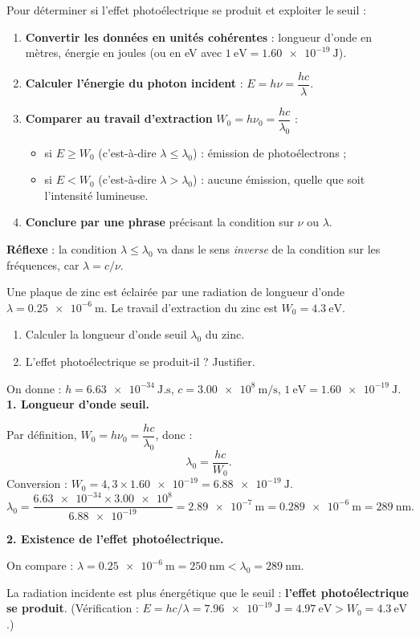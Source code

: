\documentclass[11pt]{article}
\begin{document}
\begin{methode}
Pour déterminer si l'effet photoélectrique se produit et exploiter le seuil :
\begin{enumerate}
\item \textbf{Convertir les données en unités cohérentes} : longueur d'onde en mètres, énergie en joules (ou en eV avec $1\ \text{eV} = \num{1,60e-19}\ \text{J}$).
\item \textbf{Calculer l'énergie du photon incident} : $E = h\nu = \dfrac{hc}{\lambda}$.
\item \textbf{Comparer au travail d'extraction} $W_0 = h\nu_0 = \dfrac{hc}{\lambda_0}$ :
\begin{itemize}
\item si $E \geq W_0$ (c'est-à-dire $\lambda \leq \lambda_0$) : émission de photoélectrons ;
\item si $E < W_0$ (c'est-à-dire $\lambda > \lambda_0$) : aucune émission, quelle que soit l'intensité lumineuse.
\end{itemize}
\item \textbf{Conclure par une phrase} précisant la condition sur $\nu$ ou $\lambda$.
\end{enumerate}
\textbf{Réflexe} : la condition $\lambda \leq \lambda_0$ va dans le sens \emph{inverse} de la condition sur les fréquences, car $\lambda = c/\nu$.
\end{methode}

\begin{exoresolu}
Une plaque de zinc est éclairée par une radiation de longueur d'onde $\lambda = \num{0,25e-6}\ \text{m}$. Le travail d'extraction du zinc est $W_0 = \num{4,3}\ \text{eV}$.
\begin{enumerate}
\item Calculer la longueur d'onde seuil $\lambda_0$ du zinc.
\item L'effet photoélectrique se produit-il ? Justifier.
\end{enumerate}
On donne : $h = \num{6,63e-34}\ \text{J.s}$, $c = \num{3,00e8}\ \text{m/s}$, $1\ \text{eV} = \num{1,60e-19}\ \text{J}$.
\tcblower
\textbf{1. Longueur d'onde seuil.}

Par définition, $W_0 = h\nu_0 = \dfrac{hc}{\lambda_0}$, donc :
\[ \lambda_0 = \frac{hc}{W_0}. \]
Conversion : $W_0 = 4{,}3 \times \num{1,60e-19} = \num{6,88e-19}\ \text{J}$.
\[ \lambda_0 = \frac{\num{6,63e-34} \times \num{3,00e8}}{\num{6,88e-19}} = \num{2,89e-7}\ \text{m} = \num{0,289e-6}\ \text{m} = \num{289}\ \text{nm}. \]

\textbf{2. Existence de l'effet photoélectrique.}

On compare : $\lambda = \num{0,25e-6}\ \text{m} = \num{250}\ \text{nm} < \lambda_0 = \num{289}\ \text{nm}$.

La radiation incidente est plus énergétique que le seuil : \textbf{l'effet photoélectrique se produit}. (Vérification : $E = hc/\lambda = \num{7,96e-19}\ \text{J} = \num{4,97}\ \text{eV} > W_0 = \num{4,3}\ \text{eV}$.)
\end{exoresolu}
\end{document}
